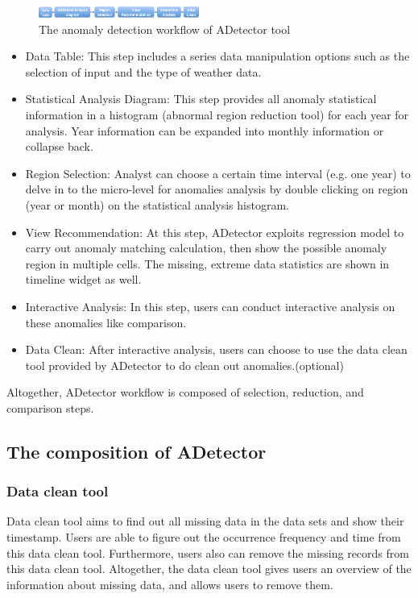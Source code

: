 \documentclass{vgtc}                          %
\begin{document}
\begin{figure}[htb]
	\centering
	\includegraphics[width=0.47\textwidth]{workflow.png}
	\caption{The anomaly detection workflow of ADetector tool}
	\label{fig:workflow}
\end{figure}

\begin{itemize}
	\item Data Table: This step includes a series data manipulation options such as the selection of input and the type of weather data. 
	\item Statistical Analysis Diagram: This step provides all anomaly statistical information in a histogram (abnormal region reduction tool) for each year for analysis. Year information can be expanded into monthly information or collapse back.
	\item Region Selection: Analyst can choose a certain time interval (e.g. one year) to delve in to the micro-level for anomalies analysis by double clicking on region (year or month) on the statistical analysis histogram.
	\item View Recommendation: At this step, ADetector exploits regression model to carry out anomaly matching calculation, then show the possible anomaly region in multiple cells. The missing, extreme data statistics are shown in timeline widget as well.
	\item Interactive Analysis: In this step, users can conduct interactive analysis on these anomalies like comparison.
	\item Data Clean: After interactive analysis, users can choose to use the data clean tool provided by ADetector to do clean out anomalies.(optional)
\end{itemize}
Altogether, ADetector workflow is composed of selection, reduction, and comparison steps.

\subsection{The composition of ADetector}
\subsubsection{Data clean tool}

Data clean tool aims to find out all missing data in the data sets and show their timestamp. Users are able to figure out the occurrence frequency and time from this data clean tool. Furthermore, users also can remove the missing records from this data clean tool. Altogether, the data clean tool gives users an overview of the information about missing data, and allows users to remove them. 
\end{document}
